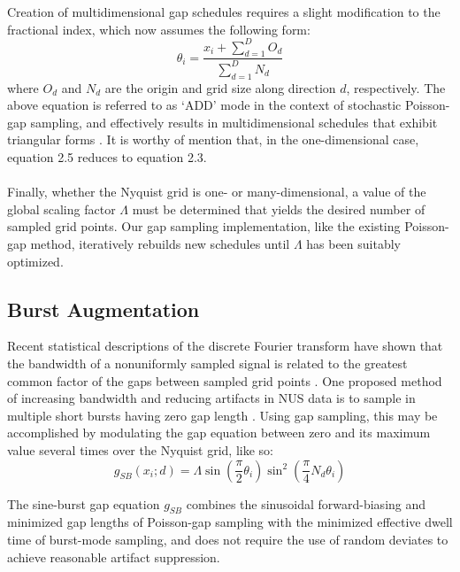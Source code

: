 \begin{doublespace}
Creation of multidimensional gap schedules requires a slight modification to
the fractional index, which now assumes the following form:
\begin{equation}
\theta_i = \frac{x_i + \sum_{d=1}^D O_d}{\sum_{d=1}^D N_d}
\end{equation}
where $O_d$ and $N_d$ are the origin and grid size along direction $d$,
respectively. The above equation is referred to as `ADD' mode in the context
of stochastic Poisson-gap sampling, and effectively results in multidimensional
schedules that exhibit triangular forms \cite{hyberts:jmr2014}. It is worthy of
mention that, in the one-dimensional case, equation 2.5 reduces to equation
2.3.
\\\\
Finally, whether the Nyquist grid is one- or many-dimensional, a value of the
global scaling factor $\Lambda$ must be determined that yields the desired
number of sampled grid points. Our gap sampling implementation, like the
existing Poisson-gap method, iteratively rebuilds new schedules until
$\Lambda$ has been suitably optimized.
\end{doublespace}

\subsection{Burst Augmentation}

\begin{doublespace}
Recent statistical descriptions of the discrete Fourier transform have shown
that the bandwidth of a nonuniformly sampled signal is related to the greatest
common factor of the gaps between sampled grid points
\cite{bretthorst:cmr2008}. One proposed method of increasing bandwidth and
reducing artifacts in NUS data is to sample in multiple short bursts having
zero gap length \cite{maciejewski:jmr2009}. Using gap sampling, this may be
accomplished by modulating the gap equation between zero and its maximum value
several times over the Nyquist grid, like so:
\begin{equation}
g_{SB}(x_i; d) = \Lambda
 \sin \left( \frac{\pi}{2} \theta_i \right)
 \sin^2 \left( \frac{\pi}{4} N_d \theta_i \right)
\end{equation}

The sine-burst gap equation $g_{SB}$ combines the sinusoidal forward-biasing
and minimized gap lengths of Poisson-gap sampling with the minimized effective
dwell time of burst-mode sampling, and does not require the use of random
deviates to achieve reasonable artifact suppression.
\end{doublespace}

